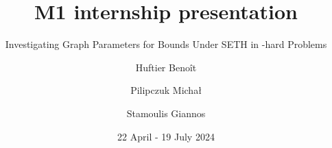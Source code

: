 

\title{M1 internship presentation}
\subtitle{Investigating Graph Parameters for Bounds Under SETH in \NP-hard Problems}
\date{22 April - 19 July 2024}
\author[Huftier Benoît]{Huftier Benoît  \and Pilipczuk Micha\l{}  \and Stamoulis Giannos }
